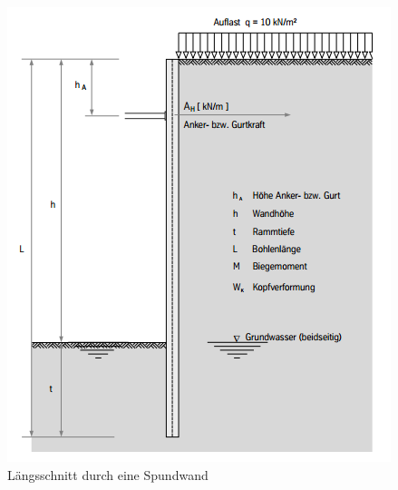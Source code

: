 \documentclass[11pt,fleqn,a4paper]{article}
\begin{document}
\begin{figure}[h!]
\includegraphics[scale=0.4]{Spundwandlangs.png}
\caption{Längsschnitt durch eine Spundwand \cite[1.6 S.10]{spund}}
\end{figure}
\newpage
\end{document}
